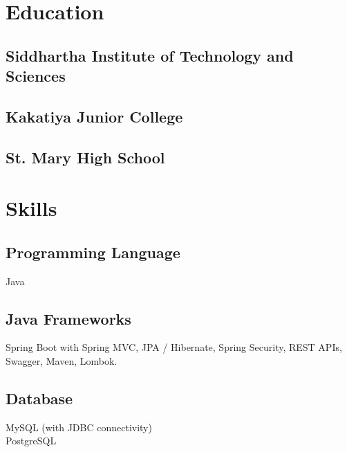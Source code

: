 \documentclass[]{deedy-resume-openfont}
\begin{document}
\begin{minipage}[t]{0.33\textwidth}
\section{Education} 

\subsection{Siddhartha Institute of \newline Technology and Sciences}
\sectionsep

\subsection{Kakatiya Junior College}
\sectionsep

\subsection{St. Mary High School}
\sectionsep


\section{Skills}
\subsection{Programming Language}
\textbullet{} Java  \\ 
\sectionsep

\subsection{Java Frameworks}
\textbullet{} Spring Boot with Spring MVC, 
JPA / Hibernate, 
Spring Security, REST APIs, Swagger, Maven, Lombok. \\ 
\sectionsep


\subsection{Database}
\textbullet{} MySQL (with JDBC connectivity)\\ 
\textbullet{} PostgreSQL
\sectionsep


\end{minipage}
\end{document}

